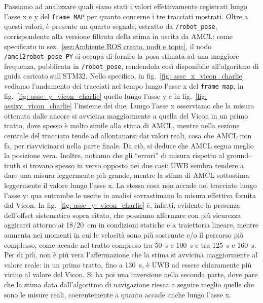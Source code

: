 \vspace{0.5cm}
Passiamo ad analizzare quali siano stati i valori effettivamente registrati lungo l'asse x e y del \verb|frame MAP| per quanto concerne i tre tracciati mostrati. Oltre a questi valori, è presente un quarto segnale, estratto da \verb|/robot_pose|, corrispondente alla versione filtrata della stima in uscita da AMCL: come specificato in sez.~\ref{sez:Ambiente ROS creato, nodi e topic}, il nodo \verb|/amcl2robot_pose_PY| si occupa di fornire la posa stimata ad una maggiore frequenza, pubblicata in \verb|/robot_pose|, rendendola cos\`i disponibile all'algoritmo di guida caricato sull'STM32.
Nello specifico, in fig.~\ref{fig: asse_x_vicon_charlie} vediamo l'andamento dei tracciati nel tempo lungo l'asse x del \verb|frame map|, in fig.~\ref{fig: asse_y_vicon_charlie} quello lungo l'asse  y e in fig.~\ref{fig: assixy_vicon_charlie} l'insieme dei due. Lungo l'asse x osserviamo che la misura ottenuta dalle ancore si avvicina maggiormente a quella del Vicon in un primo tratto, dove spesso è molto simile alla stima di AMCL, mentre nella sezione centrale del tracciato tende ad allontanarsi dai valori reali, cosa che AMCL non fa, per riavvicinarsi nella parte finale. Da ciò, si deduce che AMCL segua meglio la posizione vera. Inoltre, notiamo che gli ``errori'' di misura rispetto al ground--truth si trovano spesso in verso opposto nei due casi: UWB sembra tendere a dare una misura leggermente più grande, mentre la stima di AMCL sottostima leggermente il valore lungo l'asse x. La stessa cosa non accade nel tracciato lungo l'asse y: qua entrambe le uscite in analisi sovrastimano la misura effettiva fornita dal Vicon. In fig.~\ref{fig: asse_y_vicon_charlie} è, infatti, evidente la presenza dell'offset sistematico sopra citato, che possiamo affermare con più sicurezza aggirarsi attorno ai \SI{18/20}{\centi \metre} in condizioni statiche e a traiettoria lineare, mentre aumenta nei momenti in cui le velocità sono più sostenute e/o il percorso più complesso, come accade nel tratto compreso tra \SI{50}{\second} e \SI{100}{\second} e tra \SI{125}{\second} e \SI{160}{\second}. Per di più, non è più vera l'affermazione che la stima si avvicina maggiormente al valore reale: in un primo tratto, fino a \SI{130}{\second}, è UWB ad essere chiaramente più vicino al valore del Vicon. Si ha poi una inversione nella seconda parte, dove pare che la stima data dall'algoritmo di navigazione riesca a seguire meglio quelle che sono le misure reali, coerentemente a quanto accade anche lungo l'asse x.

